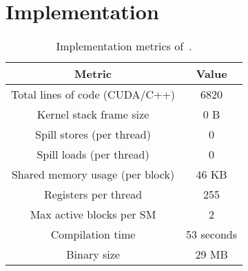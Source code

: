 \section{Implementation}\label{sec:implementation}
\begin{table}[h]
    \centering
    \caption{Implementation metrics of~\sysname.}
    \label{tab:kleos-metrics}
    \begin{tabular}{cc}
        \toprule
        \textbf{Metric} & \textbf{Value}\\ \hline
        Total lines of code (CUDA/C++) & 6820 \\
        Kernel stack frame size & 0 B \\
        Spill stores (per thread) & 0 \\
        Spill loads (per thread) & 0 \\
        Shared memory usage (per block) & 46 KB \\
        Registers per thread & 255 \\
        Max active blocks per SM & 2 \\
        Compilation time & 53 seconds \\
        Binary size & 29 MB\\
    \end{tabular}
\end{table}

